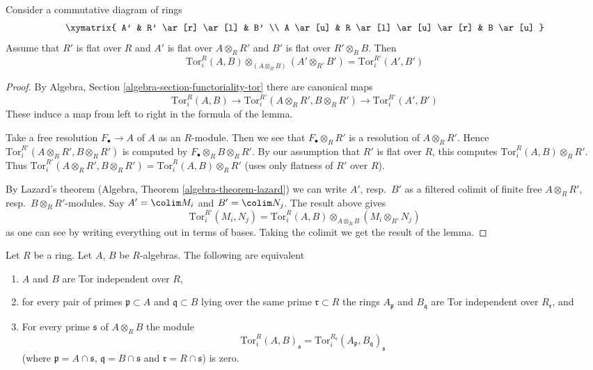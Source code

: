 \begin{lemma}
\label{lemma-tor-independent-flat}
Consider a commutative diagram of rings
$$
\xymatrix{
A' & R' \ar[r] \ar[l] & B' \\
A \ar[u] & R \ar[l] \ar[u] \ar[r] & B \ar[u]
}
$$
Assume that $R'$ is flat over $R$ and $A'$ is flat over $A \otimes_R R'$
and $B'$ is flat over $R' \otimes_R B$. Then
$$
\text{Tor}_i^R(A, B) \otimes_{(A \otimes_R B)} (A' \otimes_{R'} B') =
\text{Tor}_i^{R'}(A', B')
$$
\end{lemma}

\begin{proof}
By Algebra, Section \ref{algebra-section-functoriality-tor} there are
canonical maps
$$
\text{Tor}_i^R(A, B) \longrightarrow
\text{Tor}_i^{R'}(A \otimes_R R', B \otimes_R R') \longrightarrow
\text{Tor}_i^{R'}(A', B')
$$
These induce a map from left to right in the formula of the lemma.

\medskip\noindent
Take a free resolution $F_\bullet \to A$ of $A$ as an $R$-module.
Then we see that $F_\bullet \otimes_R R'$ is a resolution of $A \otimes_R R'$.
Hence $\text{Tor}_i^{R'}(A \otimes_R R', B \otimes_R R')$ is computed
by $F_\bullet \otimes_R B \otimes_R R'$. By our assumption that $R'$
is flat over $R$, this computes $\text{Tor}_i^R(A, B) \otimes_R R'$.
Thus $\text{Tor}_i^{R'}(A \otimes_R R', B \otimes_R R') =
\text{Tor}_i^R(A, B) \otimes_R R'$ (uses only flatness of $R'$ over $R$).

\medskip\noindent
By Lazard's theorem (Algebra, Theorem \ref{algebra-theorem-lazard})
we can write $A'$, resp.\ $B'$ as a filtered colimit of finite free
$A \otimes_R R'$, resp.\ $B \otimes_R R'$-modules. Say
$A' = \colim M_i$ and $B' = \colim N_j$. The result above gives
$$
\text{Tor}_i^{R'}(M_i, N_j) =
\text{Tor}_i^R(A, B) \otimes_{A \otimes_R B} (M_i \otimes_{R'} N_j)
$$
as one can see by writing everything out in terms of bases.
Taking the colimit we get the result of the lemma.
\end{proof}

\begin{lemma}
\label{lemma-tor-independent}
Let $R$ be a ring. Let $A$, $B$ be $R$-algebras. The following are equivalent
\begin{enumerate}
\item $A$ and $B$ are Tor independent over $R$,
\item for every pair of primes $\mathfrak p \subset A$ and
$\mathfrak q \subset B$ lying over the same prime $\mathfrak r \subset R$
the rings $A_\mathfrak p$ and $B_\mathfrak q$ are Tor independent over
$R_\mathfrak r$, and
\item For every prime $\mathfrak s$ of $A \otimes_R B$ the module
$$
\text{Tor}_i^R(A, B)_\mathfrak s =
\text{Tor}_i^{R_\mathfrak r}(A_\mathfrak p, B_\mathfrak q)_\mathfrak s
$$
(where $\mathfrak p = A \cap \mathfrak s$, $\mathfrak q = B \cap \mathfrak s$
and $\mathfrak r = R \cap \mathfrak s$) is zero.
\end{enumerate}
\end{lemma}


